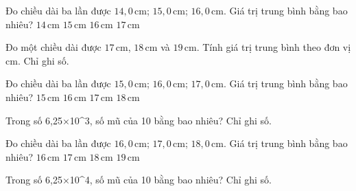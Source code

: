 \begin{ex}
Đo chiều dài ba lần được $14,0\,\text{cm}$; $15,0\,\text{cm}$; $16,0\,\text{cm}$. Giá trị trung bình bằng bao nhiêu?
\choice
{$14\,\text{cm}$}
{\True $15\,\text{cm}$}
{$16\,\text{cm}$}
{$17\,\text{cm}$}
\end{ex}

\begin{ex}
Đo một chiều dài được $17\,\text{cm}$, $18\,\text{cm}$ và $19\,\text{cm}$. Tính giá trị trung bình theo đơn vị cm. Chỉ ghi số.
\end{ex}

\begin{ex}
Đo chiều dài ba lần được $15,0\,\text{cm}$; $16,0\,\text{cm}$; $17,0\,\text{cm}$. Giá trị trung bình bằng bao nhiêu?
\choice
{$15\,\text{cm}$}
{\True $16\,\text{cm}$}
{$17\,\text{cm}$}
{$18\,\text{cm}$}
\end{ex}

\begin{ex}
Trong số 6,25×10^3, số mũ của 10 bằng bao nhiêu? Chỉ ghi số.
\end{ex}

\begin{ex}
Đo chiều dài ba lần được $16,0\,\text{cm}$; $17,0\,\text{cm}$; $18,0\,\text{cm}$. Giá trị trung bình bằng bao nhiêu?
\choice
{$16\,\text{cm}$}
{\True $17\,\text{cm}$}
{$18\,\text{cm}$}
{$19\,\text{cm}$}
\end{ex}

\begin{ex}
Trong số 6,25×10^4, số mũ của 10 bằng bao nhiêu? Chỉ ghi số.
\end{ex}

